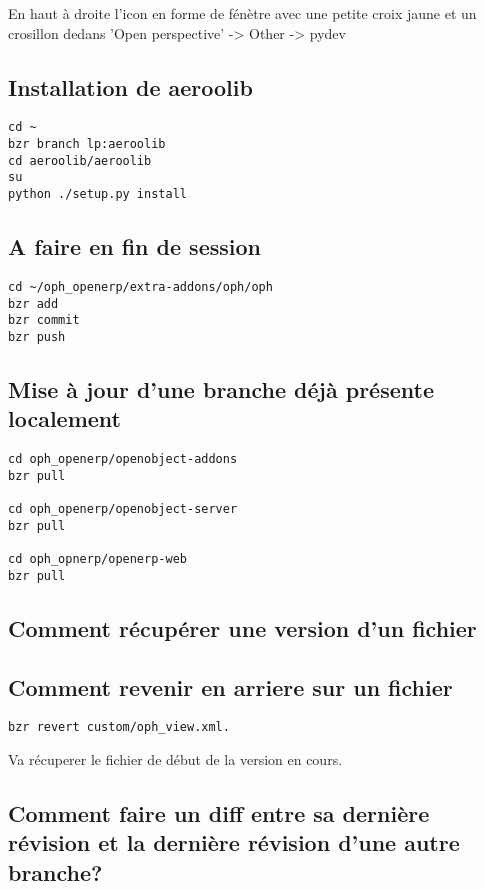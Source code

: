 \documentclass[12pt,a4paper]{article}
\begin{document}
En haut à droite l'icon en forme de fénètre avec une petite croix jaune et un crosillon dedans 'Open perspective' -> Other -> pydev
\subsection{Installation de aeroolib}
\label{sec:aeroolibinstall}

\begin{verbatim}
cd ~
bzr branch lp:aeroolib
cd aeroolib/aeroolib
su
python ./setup.py install
\end{verbatim}

\subsection{A faire en fin de session}
\label{sec:finsession}

\begin{verbatim}
cd ~/oph_openerp/extra-addons/oph/oph
bzr add 
bzr commit
bzr push
\end{verbatim}

\subsection{Mise à jour d'une branche déjà présente localement}
\label{sec:miseajour}

\begin{verbatim}
cd oph_openerp/openobject-addons
bzr pull

cd oph_openerp/openobject-server
bzr pull

cd oph_opnerp/openerp-web
bzr pull
\end{verbatim}

\subsection{Comment récupérer une version d'un fichier}
\label{sec:version}

\subsection{Comment revenir en arriere sur un fichier}
\label{sec:comeback}

\begin{verbatim}
bzr revert custom/oph_view.xml.
\end{verbatim}


Va récuperer le fichier de début de la version en cours.

\subsection{Comment faire un diff entre sa dernière révision et la dernière révision d'une autre branche?}
\label{sec:difffrombranh2branche}
\end{document}
